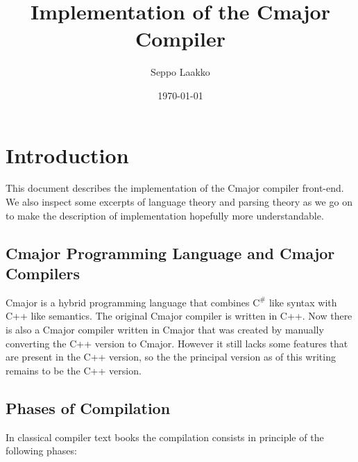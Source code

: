 \documentclass[a4paper,oneside,11pt]{book}
\theoremstyle{definition}
\begin{document}
\frontmatter
\title{Implementation of the Cmajor Compiler}
\author{Seppo Laakko}
\date{\today}
\maketitle
\tableofcontents

\mainmatter

\chapter{Introduction}

This document describes the implementation of the Cmajor compiler front-end.
We also inspect some excerpts of language theory and parsing theory as we go on
to make the description of implementation hopefully more understandable.

\section{Cmajor Programming Language and Cmajor Compilers}

Cmajor is a hybrid programming language that combines $\textrm{C}^\#$ like syntax with C++ like semantics.
The original Cmajor compiler is written in C++.
Now there is also a Cmajor compiler written in Cmajor that was created by manually converting
the C++ version to Cmajor. However it still lacks some features that are present in the C++ version, so the
the principal version as of this writing remains to be the C++ version.

\section{Phases of Compilation}

In classical compiler text books the compilation consists in principle of the following phases:
\end{document}
